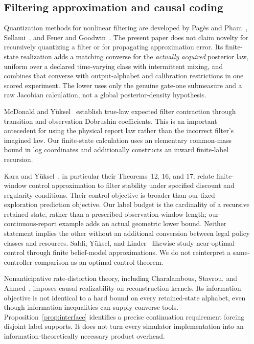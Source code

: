 \subsection{Filtering approximation and causal coding}
Quantization methods for nonlinear filtering are developed by Pag\`es and Pham~\cite{pages}, Sellami~\cite{sellami}, and Feuer and Goodwin~\cite{feuer}. The present paper does not claim novelty for recursively quantizing a filter or for propagating approximation error. Its finite-state realization adds a matching converse for the \emph{actually acquired} posterior law, uniform over a declared time-varying class with intermittent mixing, and combines that converse with output-alphabet and calibration restrictions in one scored experiment. The lower uses only the genuine gate-one submeasure and a raw Jacobian calculation, not a global posterior-density hypothesis.

McDonald and Y\"uksel~\cite{mcdonald} establish true-law expected filter contraction through transition and observation Dobrushin coefficients. This is an important antecedent for using the physical report law rather than the incorrect filter's imagined law. Our finite-state calculation uses an elementary common-mass bound in log coordinates and additionally constructs an inward finite-label recursion.

Kara and Y\"uksel~\cite{kara}, in particular their Theorems~12, 16, and 17, relate finite-window control approximation to filter stability under specified discount and regularity conditions. Their control objective is broader than our fixed-exploration prediction objective. Our label budget is the cardinality of a recursive retained state, rather than a prescribed observation-window length; our continuous-report example adds an actual geometric lower bound. Neither statement implies the other without an additional conversion between legal policy classes and resources. Saldi, Y\"uksel, and Linder~\cite{saldi} likewise study near-optimal control through finite belief-model approximations. We do not reinterpret a same-controller comparison as an optimal-control theorem.

Nonanticipative rate-distortion theory, including Charalambous, Stavrou, and Ahmed~\cite{nonanticipative}, imposes causal realizability on reconstruction kernels. Its information objective is not identical to a hard bound on every retained-state alphabet, even though information inequalities can supply converse tools. Proposition~\ref{prop:interface} identifies a precise continuation requirement forcing disjoint label supports. It does not turn every simulator implementation into an information-theoretically necessary product overhead.

